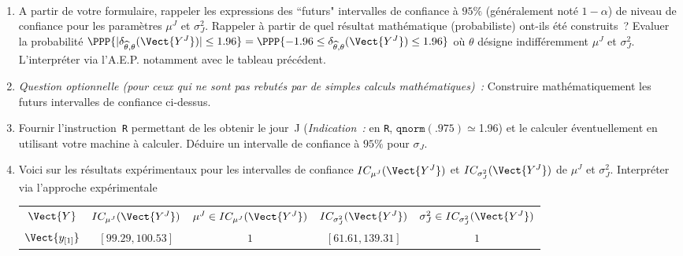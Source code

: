 \documentclass[10pt]{report}
\begin{document}
\begin{exercice}${ }$
\begin{enumerate}
\item A partir de votre formulaire, rappeler les expressions des ``futurs"  intervalles de confiance à $95\%$ (généralement noté $1-\alpha$) de niveau de confiance pour les paramètres $\mu^J$ et $\sigma^2_J$. Rappeler à partir de quel résultat mathématique (probabiliste) ont-ils été construits~?
Evaluer la probabilité $\PPP{|\delta_{\widehat\theta,\theta}(\Vect{Y^J})| \leq 1.96}=\PPP{-1.96 \leq \delta_{\widehat\theta,\theta}(\Vect{Y^J}) \leq 1.96}$ où $\theta$ désigne indifféremment $\mu^J$ et $\sigma^2_J$. L'interpréter via l'A.E.P. notamment avec le tableau précédent.
\item \textit{Question optionnelle (pour ceux qui ne sont pas rebutés par de simples calculs mathématiques)~:} Construire mathématiquement les futurs intervalles de confiance ci-dessus. 
\item Fournir l'instruction~\texttt{R} permettant de les obtenir le jour~J (\textit{Indication~:} en \texttt{R}, $\mathtt{qnorm(.975)}\simeq$1.96) et le calculer éventuellement en utilisant votre machine à calculer. Déduire un intervalle de confiance à $95\%$ pour $\sigma_J$.
\item Voici sur les résultats expérimentaux pour les intervalles de confiance $IC_{\mu^J}(\Vect{Y^J})$ et $IC_{\sigma^2_J}(\Vect{Y^J})$ de $\mu^J$ et $\sigma^2_J$. Interpréter via l'approche expérimentale
\begin{center}\begin{tabular}{c|cc|cc}
        $\Vect{Y}$
         & 
    
        $IC_{\mu^J}(\Vect{Y^J})$
         & 
    
        $\mu^J\in IC_{\mu^J}(\Vect{Y^J})$
         & 
    
        $IC_{\sigma^2_J}(\Vect{Y^J})$
         & 
    
        $\sigma^2_J\in IC_{\sigma^2_J}(\Vect{Y^J})$
        
    \\ \cline{1-5}

    
        $\Vect{y_{[1]}}$
         & 
    
        $[99.29,100.53]$
         & 
    
        $1$
         & 
    
        $[61.61,139.31]$
         & 
    
        $1$
        

\end{tabular}
\end{center}
\end{enumerate}
\end{exercice}
\end{document}
